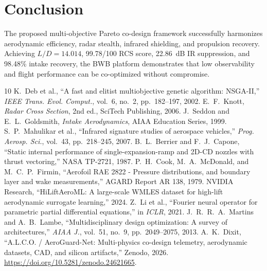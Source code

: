 \documentclass[journal,10pt,twocolumn]{IEEEtran}
\begin{document}
\section{Conclusion}
The proposed multi-objective Pareto co-design framework successfully harmonizes aerodynamic efficiency, radar stealth, infrared shielding, and propulsion recovery. Achieving $L/D = 14.014$, 99.78/100 RCS score, 22.86~dB IR suppression, and 98.48\% intake recovery, the BWB platform demonstrates that low observability and flight performance can be co-optimized without compromise.

\begin{thebibliography}{10}
 K.~Deb et al., ``A fast and elitist multiobjective genetic algorithm: NSGA-II,'' \emph{IEEE Trans. Evol. Comput.}, vol.~6, no.~2, pp.~182--197, 2002.
 E.~F.~Knott, \emph{Radar Cross Section}, 2nd ed., SciTech Publishing, 2006.
 J.~Seddon and E.~L.~Goldsmith, \emph{Intake Aerodynamics}, AIAA Education Series, 1999.
 S.~P.~Mahulikar et al., ``Infrared signature studies of aerospace vehicles,'' \emph{Prog. Aerosp. Sci.}, vol.~43, pp.~218--245, 2007.
 B.~L.~Berrier and F.~J.~Capone, ``Static internal performance of single-expansion-ramp and 2D-CD nozzles with thrust vectoring,'' NASA TP-2721, 1987.
 P.~H.~Cook, M.~A.~McDonald, and M.~C.~P.~Firmin, ``Aerofoil RAE 2822 - Pressure distributions, and boundary layer and wake measurements,'' AGARD Report AR 138, 1979.
 NVIDIA Research, ``HiLiftAeroML: A large-scale WMLES dataset for high-lift aerodynamic surrogate learning,'' 2024.
 Z.~Li et al., ``Fourier neural operator for parametric partial differential equations,'' in \emph{ICLR}, 2021.
 J.~R.~R.~A.~Martins and A.~B.~Lambe, ``Multidisciplinary design optimization: A survey of architectures,'' \emph{AIAA J.}, vol.~51, no.~9, pp.~2049--2075, 2013.
 A.~K.~Dixit, ``A.L.C.O. / AeroGuard-Net: Multi-physics co-design telemetry, aerodynamic datasets, CAD, and silicon artifacts,'' Zenodo, 2026. \url{https://doi.org/10.5281/zenodo.24621665}.
\end{thebibliography}
\end{document}
